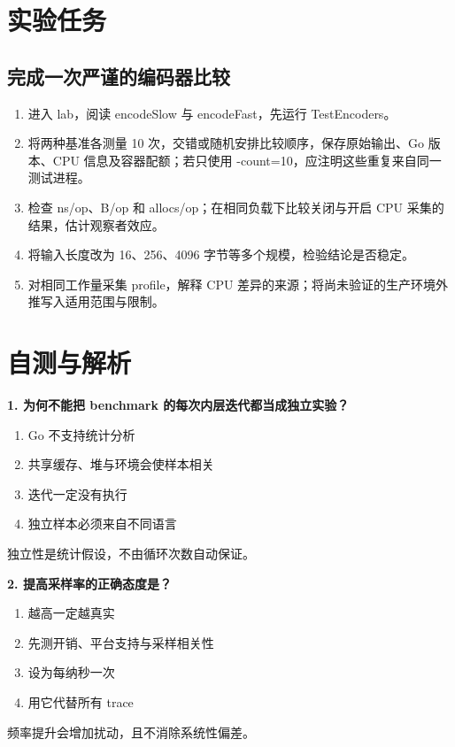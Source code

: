 \documentclass[UTF8,fontset=fandol,openany,11pt]{ctexbook}
\begin{document}
\section{实验任务}
\subsection*{完成一次严谨的编码器比较}
\begin{enumerate}
\item 进入 lab，阅读 encodeSlow 与 encodeFast，先运行 TestEncoders。

\item 将两种基准各测量 10 次，交错或随机安排比较顺序，保存原始输出、Go 版本、CPU 信息及容器配额；若只使用 -count=10，应注明这些重复来自同一测试进程。

\item 检查 ns/op、B/op 和 allocs/op；在相同负载下比较关闭与开启 CPU 采集的结果，估计观察者效应。

\item 将输入长度改为 16、256、4096 字节等多个规模，检验结论是否稳定。

\item 对相同工作量采集 profile，解释 CPU 差异的来源；将尚未验证的生产环境外推写入适用范围与限制。

\end{enumerate}
\section{自测与解析}
\noindent\textbf{1. 为何不能把 benchmark 的每次内层迭代都当成独立实验？}
\begin{enumerate}[label=\Alph*.]
\item Go 不支持统计分析
\item 共享缓存、堆与环境会使样本相关
\item 迭代一定没有执行
\item 独立样本必须来自不同语言
\end{enumerate}
独立性是统计假设，不由循环次数自动保证。

\noindent\textbf{2. 提高采样率的正确态度是？}
\begin{enumerate}[label=\Alph*.]
\item 越高一定越真实
\item 先测开销、平台支持与采样相关性
\item 设为每纳秒一次
\item 用它代替所有 trace
\end{enumerate}
频率提升会增加扰动，且不消除系统性偏差。
\end{document}
